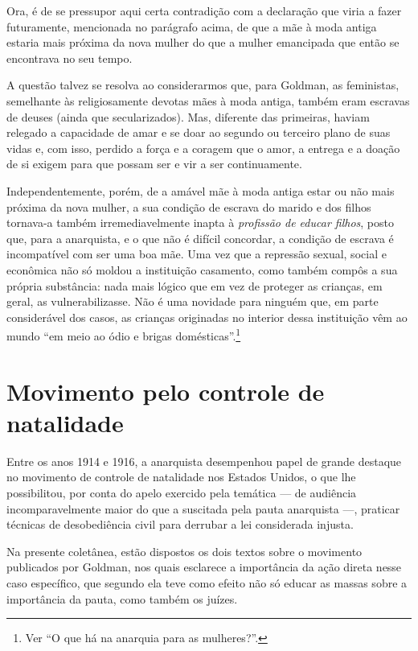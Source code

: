 Ora, é de se pressupor aqui certa contradição com a declaração que viria
a fazer futuramente, mencionada no parágrafo acima, de que a mãe à moda
antiga estaria mais próxima da nova mulher do que a mulher emancipada
que então se encontrava no seu tempo.

A questão talvez se resolva ao
considerarmos que, para Goldman, as feministas, semelhante às
religiosamente devotas mães à moda antiga, também eram escravas de deuses (ainda que secularizados). Mas,
diferente das primeiras, haviam relegado a capacidade de
amar e se doar ao segundo ou terceiro plano de suas vidas e, com isso,
perdido a força e a coragem que o amor, a entrega e a
doação de si exigem para que possam ser e vir a ser continuamente.

Independentemente, porém, de a amável mãe à moda antiga estar ou não
mais próxima da nova mulher, a sua condição de escrava do marido e
dos filhos tornava-a também irremediavelmente inapta à \textit{profissão de
educar filhos}, posto que, para a anarquista, e o que não é difícil
concordar, a condição de escrava é incompatível com ser uma boa mãe.
Uma vez que a repressão sexual, social e econômica não só moldou a
instituição casamento, como também compôs a sua própria substância:
nada mais lógico que em vez de proteger as crianças, em geral, as
vulnerabilizasse. Não é uma novidade para ninguém que, em parte
considerável dos casos, as crianças originadas no interior dessa
instituição vêm ao mundo ``em meio ao ódio e brigas domésticas''.\footnote{Ver ``O
que há na anarquia para as mulheres?''.}

\section{Movimento pelo controle de natalidade}

Entre os anos 1914 e 1916, a anarquista desempenhou papel de grande
destaque no movimento de controle de natalidade nos Estados Unidos, o
que lhe possibilitou, por conta do apelo exercido pela temática --- de
audiência incomparavelmente maior do que a suscitada pela pauta
anarquista ---, praticar técnicas de desobediência civil para
derrubar a lei considerada injusta.

Na presente coletânea, estão
dispostos os dois textos sobre o movimento
publicados por Goldman, nos quais esclarece a importância da ação
direta nesse caso específico, que segundo ela teve como efeito não só
educar as massas sobre a importância da pauta, como também os juízes.

